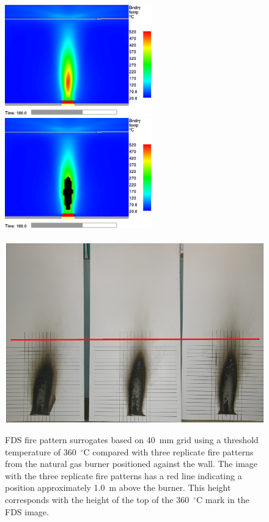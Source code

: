 \documentclass[twoside]{uocthesis}
\begin{document}
{\begin{figure}[h]
  \centering
  \includegraphics[width=2.5in]{../Figures/WallTemp_10mm_0D_0_8m_guideline}
  \includegraphics[width=2.5in]{../Figures/350CThresholdwall_temp_0_8m_guideline}\\
  \hspace{4 mm}  \\ 
  \includegraphics[width=.625\columnwidth]{../Figures/GBNGreps_w_1m_guideline}\\
  \caption[FDS fire pattern surrogates based on 40~mm grid using a threshold temperature of 350~$^\circ$C compared with three replicate fire patterns from the natural gas burner positioned against the wall]{FDS fire pattern surrogates based on 40~mm grid using a threshold temperature of 360~$^\circ$C compared with three replicate fire patterns from the natural gas burner positioned against the wall.  The image with the three replicate fire patterns has a red line indicating a position approximately 1.0~m above the burner.  This height corresponds with the height of the top of the 360~$^\circ$C mark in the FDS image.}
  \label{FDS_FirePattern_comp}
\end{figure}

}
\end{document}
